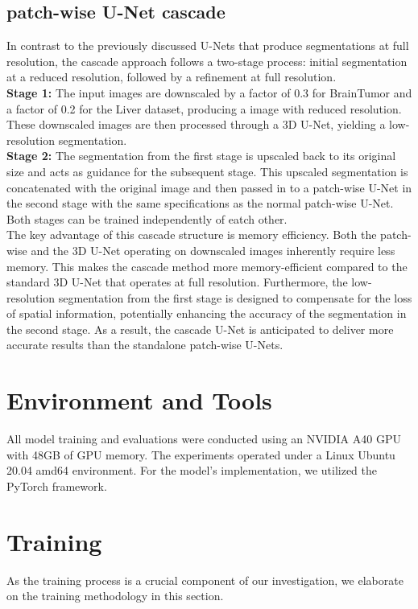 \subsection{patch-wise U-Net cascade}
In contrast to the previously discussed U-Nets that produce segmentations at full resolution, the cascade approach follows a two-stage process:
initial segmentation at a reduced resolution, followed by a refinement at full resolution.\\[1ex]
\textbf{Stage 1:}
The input images are downscaled by a factor of 0.3 for BrainTumor and a factor of 0.2 for the Liver dataset, producing a image with reduced resolution. These downscaled images are then processed through a 3D U-Net,
yielding a low-resolution segmentation.\\[1ex]
\textbf{Stage 2:}
The segmentation from the first stage is upscaled back to its original size and acts as guidance for the subsequent stage.
This upscaled segmentation is concatenated with the original image and then passed in to a patch-wise U-Net in the second stage with the same specifications as the normal patch-wise U-Net.
Both stages can be trained independently of eatch other.\\

\noindent The key advantage of this cascade structure is memory efficiency. Both the patch-wise and the 3D U-Net operating on downscaled images inherently require less memory.
This makes the cascade method more memory-efficient compared to the standard 3D U-Net that operates at full resolution. Furthermore,
the low-resolution segmentation from the first stage is designed to compensate for the loss of spatial information, potentially enhancing the accuracy of the segmentation in the second stage.
As a result, the cascade U-Net is anticipated to deliver more accurate results than the standalone patch-wise U-Nets.

\section{Environment and Tools}
All model training and evaluations were conducted using an NVIDIA A40 GPU with 48GB of GPU memory. The experiments operated under a Linux Ubuntu 20.04 amd64 environment. For the model's implementation,
we utilized the PyTorch framework.

\section{Training}
As the training process is a crucial component of our investigation, we elaborate on the training methodology in this section.
